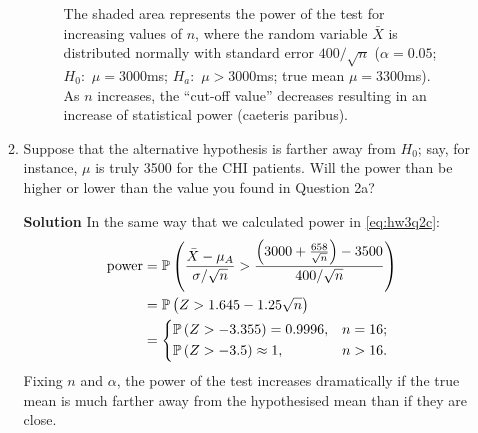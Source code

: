 \begin{enumerate}
\begin{enumerate}
\begin{figure}[h]
    \caption{The shaded area represents the power of the test for increasing values of $n$, where the random variable $\bar{X}$ is distributed normally with standard error $400/\sqrt{n}$ ($\alpha = 0.05$; $H_0:$ $\mu=3000$ms; $H_a: $ $\mu>3000$ms; true mean $\mu=3300$ms). As $n$ increases, the ``cut-off value'' decreases resulting in an increase of statistical power (caeteris paribus).}
    \label{fig:hw3q2c}
    \end{figure}
    \FloatBarrier
        
        \item Suppose that the alternative hypothesis is farther away from $H_0$; say, for instance, $\mu$ is truly 3500 for the CHI patients. Will the power than be higher or lower than the value you found in Question 2a?
        \begin{framed}{\textbf{Solution}}
        In the same way that we calculated power in \eqref{eq:hw3q2c}:
        \begin{align}
            \text{power} &= \operatorname{\mathbb{P}}{\left( \frac{\bar{X} - \mu_A}{\sigma/\sqrt{n}} > \frac{\left( 3000 + \frac{658}{\sqrt{n}}\right)-3500}{400/\sqrt{n}}\right)} \\
            &= \operatorname{\mathbb{P}}{\left( Z>1.645 - 1.25\sqrt{n}\right)}\\
            &= 
            \begin{dcases}
                \operatorname{\mathbb{P}}{\left( Z>-3.355\right)} = 0.9996, & n = 16; \\
                \operatorname{\mathbb{P}}{\left( Z>-3.5\right)} \approx 1, & n>16.
            \end{dcases}
        \end{align}
        Fixing $n$ and $\alpha$, the power of the test increases dramatically if the true mean is much farther away from the hypothesised mean than if they are close.
        \end{framed}
        

\end{enumerate}
\end{enumerate}
